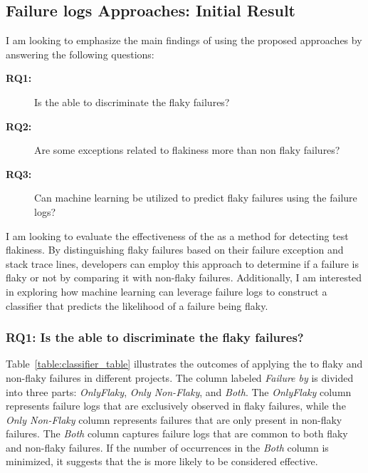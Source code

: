 \subsection{Failure logs Approaches: Initial Result}

I am looking to emphasize the main findings of using the proposed approaches by answering the following questions:

\begin{description}
  \item[\textbf{RQ1:}] Is the \syntax able to discriminate the flaky failures?
  \item[\textbf{RQ2:}] Are some exceptions related to flakiness more than non flaky failures?
  \item[\textbf{RQ3:}] Can machine learning be utilized to predict flaky failures using the failure logs?

 \end{description}



I am looking to evaluate the effectiveness of the \syntax as a method for detecting test flakiness. By distinguishing flaky failures based on their failure exception and stack trace lines, developers can employ this approach to determine if a failure is flaky or not by comparing it with non-flaky failures. Additionally, I am interested in exploring how machine learning can leverage failure logs to construct a classifier that predicts the likelihood of a failure being flaky. 

\subsubsection{RQ1: Is the \syntax able to discriminate the flaky failures?}

Table~\ref{table:classifier_table} illustrates the outcomes of applying the \syntax to flaky and non-flaky failures in different projects. The column labeled \textit{Failure by \syntax} is divided into three parts: \textit{OnlyFlaky}, \textit{Only Non-Flaky}, and \textit{Both}. The \textit{OnlyFlaky} column represents failure logs that are exclusively observed in flaky failures, while the \textit{Only Non-Flaky} column represents failures that are only present in non-flaky failures. The \textit{Both} column captures failure logs that are common to both flaky and non-flaky failures. If the number of occurrences in the \textit{Both} column is minimized, it suggests that the \syntax is more likely to be considered effective.

